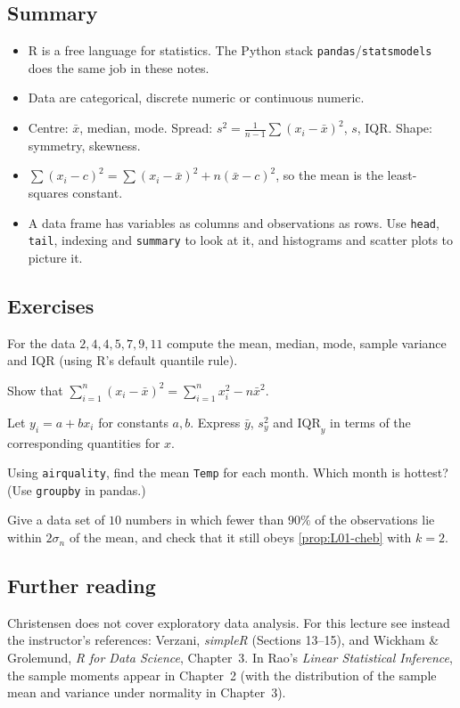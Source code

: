 \subsection{Summary}
\begin{itemize}
  \item R is a free language for statistics. The Python stack \texttt{pandas}/\texttt{statsmodels} does the same job in these notes.
  \item Data are categorical, discrete numeric or continuous numeric.
  \item Centre: $\bar x$, median, mode. Spread: $s^2=\frac{1}{n-1}\sum(x_i-\bar x)^2$, $s$, IQR. Shape: symmetry, skewness.
  \item $\sum(x_i-c)^2=\sum(x_i-\bar x)^2+n(\bar x-c)^2$, so the mean is the least-squares constant.
  \item A data frame has variables as columns and observations as rows. Use \texttt{head}, \texttt{tail}, indexing and \texttt{summary} to look at it, and histograms and scatter plots to picture it.
\end{itemize}

\subsection{Exercises}
\begin{problem}\label{prob:L01-1}
For the data $2,4,4,5,7,9,11$ compute the mean, median, mode, sample variance and IQR (using R's default quantile rule).
\end{problem}
\begin{problem}\label{prob:L01-2}
Show that $\sum_{i=1}^n (x_i-\bar x)^2=\sum_{i=1}^n x_i^2-n\bar x^2$.
\end{problem}
\begin{problem}\label{prob:L01-3}
Let $y_i=a+bx_i$ for constants $a,b$. Express $\bar y$, $s_y^2$ and $\mathrm{IQR}_y$ in terms of the corresponding quantities for $x$.
\end{problem}
\begin{problem}\label{prob:L01-4}
Using \texttt{airquality}, find the mean \texttt{Temp} for each month. Which month is hottest? (Use \texttt{groupby} in pandas.)
\end{problem}
\begin{problem}\label{prob:L01-5}
Give a data set of $10$ numbers in which fewer than $90\%$ of the observations lie within $2\sigma_n$ of the mean, and check that it still obeys \cref{prop:L01-cheb} with $k=2$.
\end{problem}

\subsection{Further reading}
Christensen does not cover exploratory data analysis. For this lecture see instead the
instructor's references: Verzani, \emph{simpleR} (Sections 13--15), and Wickham \& Grolemund,
\emph{R for Data Science}, Chapter~3. In Rao's \emph{Linear Statistical Inference}, the sample
moments appear in Chapter~2 (with the distribution of the sample mean and variance under
normality in Chapter~3).
